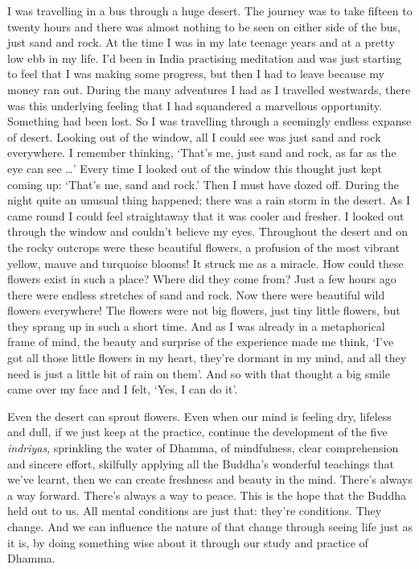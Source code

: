 I was travelling in a bus through a huge desert. The journey was to take
fifteen to twenty hours and there was almost nothing to be seen on
either side of the bus, just sand and rock. At the time I was in my late
teenage years and at a pretty low ebb in my life. I'd been in India
practising meditation and was just starting to feel that I was making some
progress, but then I had to leave because my money ran out. During the
many adventures I had as I travelled westwards, there was this
underlying feeling that I had squandered a marvellous opportunity. 
Something had been lost. So I was travelling through a seemingly endless
expanse of desert. Looking out of the window, all I could see was just
sand and rock everywhere. I remember thinking, `That's me, just sand and
rock, as far as the eye can see \ldots{}' Every time I looked out of the
window this thought just kept coming up: `That's me, sand and rock.'
Then I must have dozed off. During the night quite an unusual thing
happened; there was a rain storm in the desert. As I came round I could
feel straightaway that it was cooler and fresher. I looked out through
the window and couldn't believe my eyes. Throughout the desert and on
the rocky outcrops were these beautiful flowers, a profusion of the most
vibrant yellow, mauve and turquoise blooms! It struck me as a miracle. 
How could these flowers exist in such a place? Where did they come from? 
Just a few hours ago there were endless stretches of sand and rock. Now
there were beautiful wild flowers everywhere! The flowers were not big
flowers, just tiny little flowers, but they sprang up in such a short
time. And as I was already in a metaphorical frame of mind, the beauty
and surprise of the experience made me think, `I've got all those little
flowers in my heart, they're dormant in my mind, and all they need is
just a little bit of rain on them'. And so with that thought a big smile
came over my face and I felt, `Yes, I can do it'. 

Even the desert can sprout flowers. Even when our mind is feeling dry, 
lifeless and dull, if we just keep at the practice, continue the
development of the five \emph{indriyas}, sprinkling the water of Dhamma, 
of mindfulness, clear comprehension and sincere effort, skilfully
applying all the Buddha's wonderful teachings that we've learnt, then we
can create freshness and beauty in the mind. There's always a way
forward. There's always a way to peace. This is the hope that the Buddha
held out to us. All mental conditions are just that: they're conditions. 
They change. And we can influence the nature of that change through
seeing life just as it is, by doing something wise about it through our
study and practice of Dhamma. 

